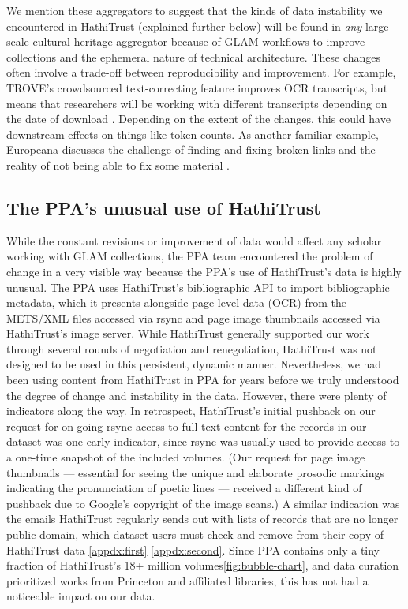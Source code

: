 \documentclass{anthology-ch}         %
\begin{document}
We mention these aggregators to suggest that the kinds of data instability we encountered in HathiTrust (explained further below) will be found in \textit{any }large-scale cultural heritage aggregator because of GLAM workflows to improve collections and the ephemeral nature of technical architecture. These changes often involve a trade-off between reproducibility and improvement. For example, TROVE’s crowdsourced text-correcting feature improves OCR transcripts, but means that researchers will be working with different transcripts depending on the date of download \cite{noauthor_text_nodate}. Depending on the extent of the changes, this could have downstream effects on things like token counts. As another familiar example, Europeana discusses the challenge of finding and fixing broken links and the reality of not being able to fix some material \cite{noauthor_keeping_nodate}.

\subsection{The PPA’s unusual use of HathiTrust}

While the constant revisions or improvement of data would affect any scholar working with GLAM collections, the PPA team encountered the problem of change in a very visible way because the PPA’s use of HathiTrust’s data is highly unusual. The PPA uses HathiTrust’s bibliographic API to import bibliographic metadata, which it presents alongside page-level data (OCR) from the METS/XML files accessed via rsync and page image thumbnails accessed via HathiTrust’s image server. While HathiTrust generally supported our work through several rounds of negotiation and renegotiation, HathiTrust was not designed to be used in this persistent, dynamic manner. Nevertheless, we had been using content from HathiTrust in PPA for years before we truly understood the degree of change and instability in the data. However, there were plenty of indicators along the way. In retrospect, HathiTrust’s initial pushback on our request for on-going rsync access to full-text content for the records in our dataset was one early indicator, since rsync was usually used to provide access to a one-time snapshot of the included volumes. (Our request for page image thumbnails — essential for seeing the unique and elaborate prosodic markings indicating the pronunciation of poetic lines — received a different kind of pushback due to Google’s copyright of the image scans.) A similar indication was the emails HathiTrust regularly sends out with lists of records that are no longer public domain, which dataset users must check and remove from their copy of HathiTrust data \ref{appdx:first} \ref{appdx:second}. Since PPA contains only a tiny fraction of HathiTrust’s 18+ million volumes\ref{fig:bubble-chart}, and data curation prioritized works from Princeton and affiliated libraries, this has not had a noticeable impact on our data.
\end{document}
